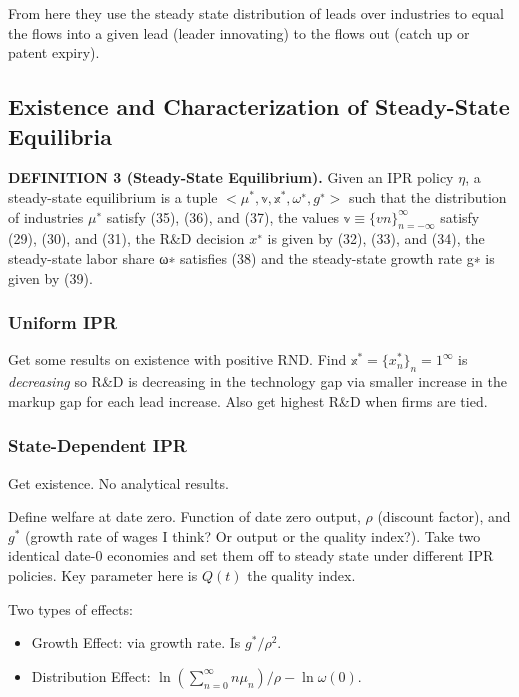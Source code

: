 \documentclass[11pt]{article}
\begin{document}
  From here they use the steady state distribution of leads over industries to equal the flows into a given lead (leader innovating) to the flows out (catch up or patent expiry).


\subsection{Existence and Characterization of Steady-State Equilibria}
\label{sub:existence_and_characterization_of_steady_state_equilibria}
  
  \textbf{DEFINITION 3 (Steady-State Equilibrium).} Given an IPR policy $\eta$, a steady-state equilibrium is a tuple $<\mathbb{\mu}^*, \mathbb{v}, \mathbb{x}^*, \omega^∗, g^∗>$ such that the distribution of industries $\mu^∗$ satisfy (35), (36), and (37), the values $\mathbb{v} \equiv \{vn\}_{n=-\infty}^{\infty}$ satisfy (29), (30), and (31), the R\&D decision $x^∗$ is given by (32), (33), and (34), the steady-state labor share ω∗ satisfies (38) and the steady-state growth rate g∗ is given by (39).


  \subsubsection{Uniform IPR}
  \label{subsub:uniform_ipr}
    Get some results on existence with positive RND.  Find $\mathbb{x}^* = \{x_n^*\}_n=1^{\infty}$ is \emph{decreasing} so R\&D is decreasing in the technology gap via smaller increase in the markup gap for each lead increase.  Also get highest R\&D when firms are tied.

  \subsubsection{State-Dependent IPR}
  \label{state_dependent_ipr}
    Get existence. No analytical results.

    Define welfare at date zero.  Function of date zero output, $\rho$ (discount factor), and $g^*$ (growth rate of wages I think? Or output or the quality index?). Take two identical date-0 economies and set them off to steady state under different IPR policies.  Key parameter here is $Q(t)$ the quality index.

    Two types of effects:
    \begin{itemize}
      \item Growth Effect: via growth rate.  Is $g^*/\rho^2$.
      \item Distribution Effect: $\ln(\sum_{n=0}^{\infty} n\mu_n)/\rho - \ln\omega(0)$.
    \end{itemize}
\end{document}
